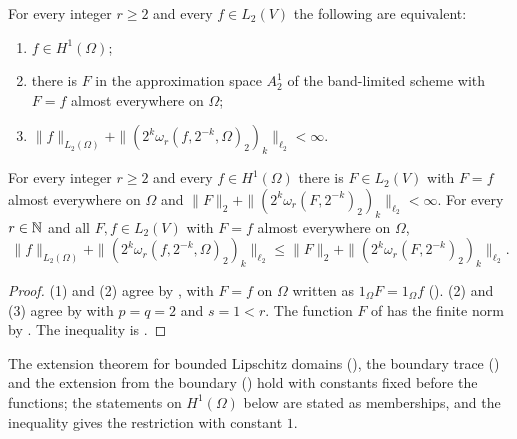 \begin{theorem}
\label{thm:sobolev-lipschitz-domain-intrinsic}
\leanok
{}
For every integer $r \geq 2$ and every $f \in L_2(V)$ the following are equivalent:
\begin{enumerate}
  \item $f \in H^1(\Omega)$;
  \item there is $F$ in the approximation space $A^1_2$ of the band-limited scheme with $F = f$
    almost everywhere on $\Omega$;
  \item $\|f\|_{L_2(\Omega)} + \|(2^k \omega_r(f, 2^{-k}, \Omega)_2)_k\|_{\ell_2} < \infty$.
\end{enumerate}
For every integer $r \geq 2$ and every $f \in H^1(\Omega)$ there is $F \in L_2(V)$ with $F = f$
almost everywhere on $\Omega$ and $\|F\|_2 + \|(2^k \omega_r(F, 2^{-k})_2)_k\|_{\ell_2} < \infty$.
For every $r \in \mathbb{N}$ and all $F, f \in L_2(V)$ with $F = f$ almost everywhere on
$\Omega$,
\[
  \|f\|_{L_2(\Omega)} + \|(2^k \omega_r(f, 2^{-k}, \Omega)_2)_k\|_{\ell_2}
  \leq \|F\|_2 + \|(2^k \omega_r(F, 2^{-k})_2)_k\|_{\ell_2}.
\]
\end{theorem}

\begin{proof}
\leanok
(1) and (2) agree by , with $F = f$ on $\Omega$ written as
$1_\Omega F = 1_\Omega f$ (). (2) and (3) agree by
 with $p = q = 2$ and $s = 1 < r$. The function $F$ of
 has the finite norm by . The
inequality is .
\end{proof}

The extension theorem for bounded Lipschitz domains (), the
boundary trace () and the extension from the boundary
() hold with constants fixed before the functions; the
statements on $H^1(\Omega)$ below are stated as memberships, and the inequality gives the
restriction with constant $1$.


